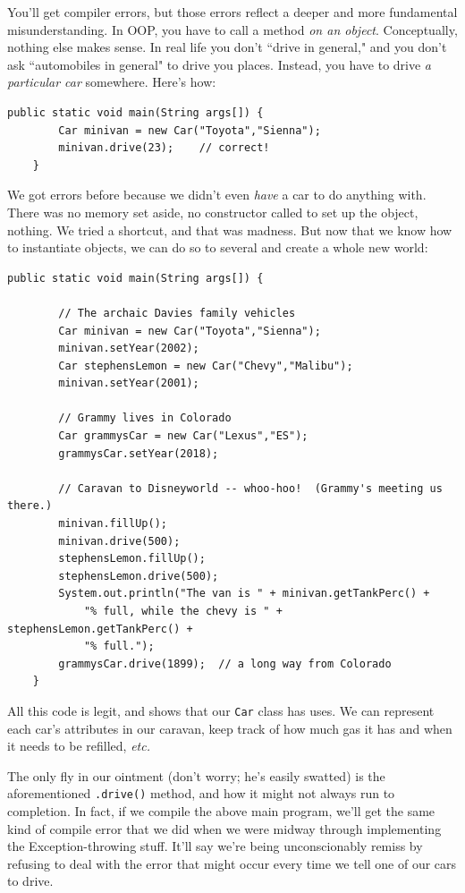 You'll get compiler errors, but those errors reflect a deeper and more
fundamental misunderstanding. In OOP, you have to call a method \textit{on an
object}. Conceptually, nothing else makes sense. In real life you don't
``drive in general," and you don't ask ``automobiles in general" to drive you
places. Instead, you have to drive \textit{a particular car} somewhere. Here's
how:

\begin{Verbatim}[samepage=true,fontsize=\footnotesize,frame=single]
    public static void main(String args[]) {
        Car minivan = new Car("Toyota","Sienna");
        minivan.drive(23);    // correct!
    }
\end{Verbatim}

We got errors before because we didn't even \textit{have} a car to do anything
with. There was no memory set aside, no constructor called to set up the
object, nothing. We tried a shortcut, and that was madness. But now that we
know how to instantiate objects, we can do so to several and create a whole
new world:

\begin{Verbatim}[samepage=true,fontsize=\footnotesize,frame=single]
    public static void main(String args[]) {

        // The archaic Davies family vehicles
        Car minivan = new Car("Toyota","Sienna");
        minivan.setYear(2002);
        Car stephensLemon = new Car("Chevy","Malibu");
        minivan.setYear(2001);

        // Grammy lives in Colorado
        Car grammysCar = new Car("Lexus","ES");
        grammysCar.setYear(2018);

        // Caravan to Disneyworld -- whoo-hoo!  (Grammy's meeting us there.)
        minivan.fillUp();
        minivan.drive(500);
        stephensLemon.fillUp();
        stephensLemon.drive(500);
        System.out.println("The van is " + minivan.getTankPerc() + 
            "% full, while the chevy is " + stephensLemon.getTankPerc() +
            "% full.");
        grammysCar.drive(1899);  // a long way from Colorado
    }
\end{Verbatim}

All this code is legit, and shows that our \texttt{Car} class has uses. We can
represent each car's attributes in our caravan, keep track of how much gas it
has and when it needs to be refilled, \textit{etc.}

The only fly in our ointment (don't worry; he's easily swatted) is the
aforementioned \texttt{.drive()} method, and how it might not always run to
completion. In fact, if we compile the above main program, we'll get the same
kind of compile error that we did when we were midway through implementing the
Exception-throwing stuff. It'll say we're being unconscionably remiss by
refusing to deal with the error that might occur every time we tell one of our
cars to drive.

